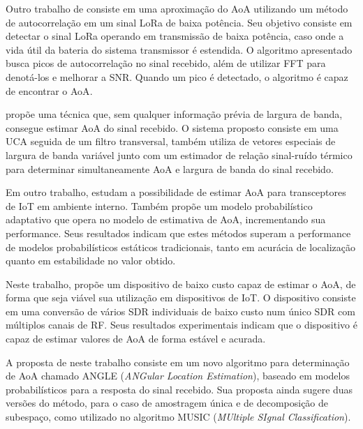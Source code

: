 Outro trabalho de \citeauthor{zeaiter:hal-03932846} \cite{zeaiter:hal-03932846} consiste em uma aproximação do \ac{AoA} utilizando um método de autocorrelação em um sinal \ac{LoRa} de baixa potência.
Seu objetivo consiste em detectar o sinal \ac{LoRa} operando em transmissão de baixa potência, caso onde a vida útil da bateria do sistema transmissor é estendida.
O algoritmo apresentado busca picos de autocorrelação no sinal recebido, além de utilizar \ac{FFT} para denotá-los e melhorar a \ac{SNR}.
Quando um pico é detectado, o algoritmo é capaz de encontrar o \ac{AoA}.


\citeauthor{bnilam20172d} \cite{bnilam20172d} propõe uma técnica que, sem qualquer informação prévia de largura de banda, consegue estimar \ac{AoA} do sinal recebido.
O sistema proposto consiste em uma \ac{UCA} seguida de um filtro transversal, também utiliza de vetores especiais de largura de banda variável junto com um estimador de relação sinal-ruído térmico para determinar simultaneamente \ac{AoA} e largura de banda do sinal recebido.

Em outro trabalho, \citeauthor{bnilam2017adaptive} \cite{bnilam2017adaptive} estudam a possibilidade de estimar \ac{AoA} para transceptores de \ac{IoT} em ambiente interno.
Também propõe um modelo probabilístico adaptativo que opera no modelo de estimativa de \ac{AoA}, incrementando sua performance.
Seus resultados indicam que estes métodos superam a performance de modelos probabilísticos estáticos tradicionais, tanto em acurácia de localização quanto em estabilidade no valor obtido.

Neste trabalho, \citeauthor{bnilam2019low} \cite{bnilam2019low} propõe um dispositivo de baixo custo capaz de estimar o \ac{AoA}, de forma que seja viável sua utilização em dispositivos de \ac{IoT}.
O dispositivo consiste em uma conversão de vários \ac{SDR} individuais de baixo custo num único \ac{SDR} com múltiplos canais de \ac{RF}.
Seus resultados experimentais indicam que o dispositivo é capaz de estimar valores de \ac{AoA} de forma estável e acurada.

A proposta de \citeauthor{bnilam2020angle} \cite{bnilam2020angle} neste trabalho consiste em um novo algoritmo para determinação de \ac{AoA} chamado ANGLE (\textit{ANGular Location Estimation}), baseado em modelos probabilísticos para a resposta do sinal recebido.
Sua proposta ainda sugere duas versões do método, para o caso de amostragem única e de decomposição de subespaço, como utilizado no algoritmo MUSIC (\textit{MUltiple SIgnal Classification}).

